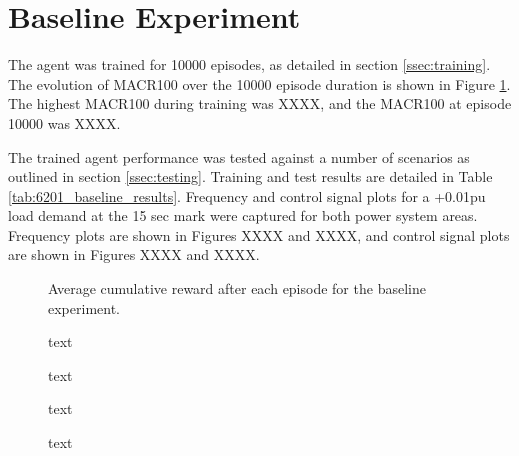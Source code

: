 \section{Baseline Experiment}
The agent was trained for 10000 episodes, as detailed in section \ref{ssec:training}. The evolution of MACR100 over the 10000 episode duration is shown in Figure \ref{fig:6201_average_reward}. The highest MACR100 during training was XXXX, and the MACR100 at episode 10000 was XXXX.

The trained agent performance was tested against a number of scenarios as outlined in section \ref{ssec:testing}. Training and test results are detailed in Table \ref{tab:6201_baseline_results}. Frequency and control signal plots for a +0.01pu load demand at the 15 sec mark were captured for both power system areas. Frequency plots are shown in Figures XXXX and XXXX, and control signal plots are shown in Figures XXXX and XXXX.

\begin{figure}[h]
	\centering
	
	\caption{Average cumulative reward after each episode for the baseline experiment.}
	\label{fig:6201_average_reward}
\end{figure}





\begin{figure}[h]
	\centering
	
	\caption{text}
	
	
	\caption{text}
	
	
	\caption{text}
		
	
	\caption{text}
\end{figure}